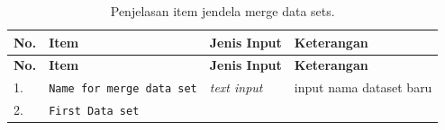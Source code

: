 \documentclass[12pt,]{krantz}
\begin{document}
\begin{longtable}[]{@{}llll@{}}
\caption{\label{tab:merge} Penjelasan item jendela merge data sets.}\tabularnewline
\toprule
\begin{minipage}[b]{0.04\columnwidth}\raggedright
\textbf{No.}\strut
\end{minipage} & \begin{minipage}[b]{0.15\columnwidth}\raggedright
\textbf{Item}\strut
\end{minipage} & \begin{minipage}[b]{0.09\columnwidth}\raggedright
\textbf{Jenis Input}\strut
\end{minipage} & \begin{minipage}[b]{0.60\columnwidth}\raggedright
\textbf{Keterangan}\strut
\end{minipage}\tabularnewline
\midrule
\endfirsthead
\toprule
\begin{minipage}[b]{0.04\columnwidth}\raggedright
\textbf{No.}\strut
\end{minipage} & \begin{minipage}[b]{0.15\columnwidth}\raggedright
\textbf{Item}\strut
\end{minipage} & \begin{minipage}[b]{0.09\columnwidth}\raggedright
\textbf{Jenis Input}\strut
\end{minipage} & \begin{minipage}[b]{0.60\columnwidth}\raggedright
\textbf{Keterangan}\strut
\end{minipage}\tabularnewline
\midrule
\endhead
\begin{minipage}[t]{0.04\columnwidth}\raggedright
1.\strut
\end{minipage} & \begin{minipage}[t]{0.15\columnwidth}\raggedright
\texttt{Name\ for\ merge\ data\ set}\strut
\end{minipage} & \begin{minipage}[t]{0.09\columnwidth}\raggedright
\emph{text input}\strut
\end{minipage} & \begin{minipage}[t]{0.60\columnwidth}\raggedright
input nama dataset baru\strut
\end{minipage}\tabularnewline
\begin{minipage}[t]{0.04\columnwidth}\raggedright
2.\strut
\end{minipage} & \begin{minipage}[t]{0.15\columnwidth}\raggedright
\texttt{First\ Data\ set}\strut
\end{minipage} & \begin{minipage}[t]{0.09\columnwidth}\raggedright

\end{minipage}
\end{longtable}
\end{document}
